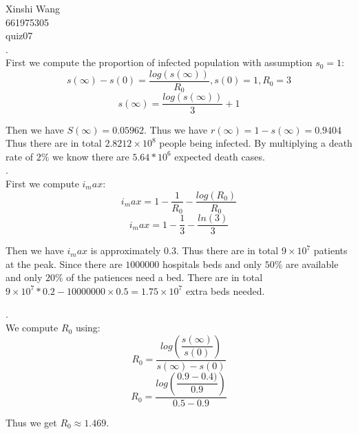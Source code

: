 \documentclass[12pt]{article}
\begin{document}
	\noindent Xinshi Wang\\
	661975305\\
	quiz07\\
	
	.\\
	
	First we compute the proportion of infected population with assumption $s_0 = 1$:\\
	$$s(\infty) - s(0) = \dfrac{log(s(\infty))}{R_0},s(0) = 1, R_0 = 3$$
	$$s(\infty) = \dfrac{log(s(\infty))}{3}+1$$
	
	Then we have $S(\infty) = 0.05962$. Thus we have $r(\infty) = 1 - s(\infty) = 0.9404$Thus there are in total $2.8212 \times 10^8$ people being infected. By multiplying a death rate of $2\%$ we know there are $5.64*10^6$ expected death cases.\\ 
	
	.\\
	
	First we compute $i_max$:
	$$i_max = 1 - \dfrac{1}{R_0} - \dfrac{log(R_0)}{R_0}$$
	$$i_max = 1 - \dfrac{1}{3} - \dfrac{ln(3)}{3}$$
	
	Then we have $i_max$ is approximately $0.3$. Thus there are in total $9\times10^7$ patients at the peak. Since there are $1000000$ hospitals beds and only $50\%$ are available and only $20\%$ of the patiences need a bed. There are in total $9\times 10^7*0.2-10000000 \times 0.5 = 1.75 \times 10^7$ extra beds needed.

	.\\
	
	We compute $R_0$ using:\\
	$$R_0 = \dfrac{log(\dfrac{s(\infty)}{s(0)})}{s(\infty)-s(0)}$$
	$$R_0 = \dfrac{log(\dfrac{0.9-0.4)}{0.9})}{0.5-0.9}$$
	
	Thus we get $R_0 \approx 1.469$.
\end{document}
